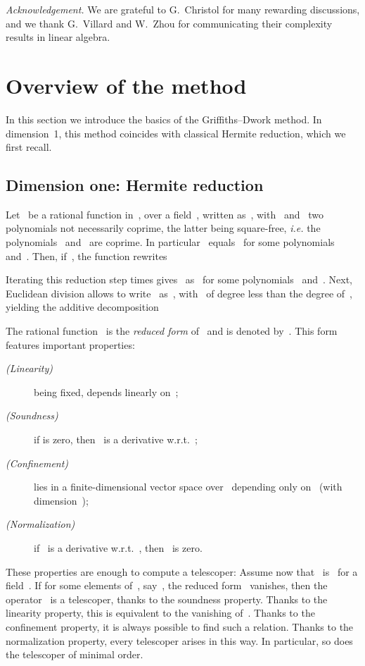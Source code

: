 \documentclass{sig-alternate}
\begin{document}
\medskip
\noindent\emph{Acknowledgement.}
We are grateful to G.~Christol for
many rewarding discussions, and we thank G.~Villard and W.~Zhou for communicating  their complexity results in linear algebra.





\section{Overview of the method}

\noindent In this section we introduce the basics of the Griffiths--Dwork method.
In dimension~1, this method coincides with classical Hermite reduction, which we first recall.

\subsection{Dimension one: Hermite reduction}\label{sec:hermite}

\noindent Let~ be a rational function in~, over a field~, written as~, with~ and~ two polynomials not necessarily coprime, the latter being square-free, \emph{i.e.} the polynomials~ and~ are coprime.
In particular~ equals~ for some polynomials~ and~.
Then, if~, the function  rewrites 

Iterating this reduction step  times gives~ as~
for some polynomials~ and~.
Next, Euclidean division allows to write~ as~, with~ of degree less than the degree of~, yielding the additive decomposition

The rational function~ is the \emph{reduced form} of~ and is denoted by~.
This form features important properties:
\begin{description}
  \item[\normalfont\emph{(Linearity)}]  being fixed,  depends linearly on~;
  \item[\normalfont\emph{(Soundness)}] if  is zero, then~ is a derivative w.r.t.~;
  \item[\normalfont\emph{(Confinement)}]  lies in a finite-dimensional vector space over~ depending only on~ (with dimension~);
  \item[\normalfont\emph{(Normalization)}] if~ is a derivative w.r.t.~, then~ is zero.
\end{description}
These properties are enough to compute a telescoper:
Assume now that~ is~ for a field~.
If for some elements of~, say~, the reduced form~ vanishes, then the operator~ is a telescoper, thanks to the soundness property.
Thanks to the linearity property, this is equivalent to the vanishing of~.
Thanks to the confinement property, it is always possible to find such a relation.
Thanks to the normalization property, every telescoper arises in this way. In particular, so does the  telescoper of minimal order.
\end{document}
